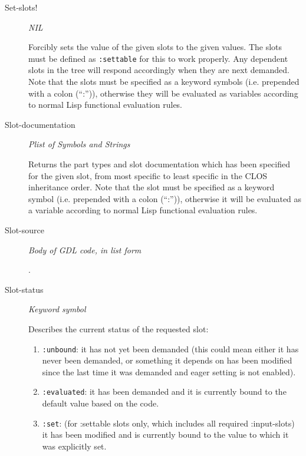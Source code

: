 \documentclass [11pt]{book}
\begin{document}
\begin{itemize}
\begin{description}
\item [Set-slots!]
\emph{NIL}

 Forcibly sets the value of the given slots to the given values. The slots must be defined
as \texttt{:settable} for this to work properly. Any dependent slots in the tree will
respond accordingly when they are next demanded. Note that the slots must be specified as a keyword
symbols (i.e. prepended with a colon (``:'')), otherwise they will be evaluated as variables according
to normal Lisp functional evaluation rules.




\item [Slot-documentation]
\emph{Plist of Symbols and Strings}

 Returns the part types and slot documentation which has been
specified for the given slot, from most specific to least specific in the CLOS inheritance order.
Note that the slot must be specified as a keyword symbol (i.e. prepended with a colon (``:'')),
otherwise it will be evaluated as a variable according to normal Lisp functional evaluation rules.




\item [Slot-source]
\emph{Body of GDL code, in list form}

.




\item [Slot-status]
\emph{Keyword symbol}

 Describes the current status of the requested slot:


\begin{enumerate}

\item \texttt{:unbound}: it has not yet been demanded (this could mean either
it has never been demanded, or something it depends on has been
modified since the last time it was demanded and eager setting is not enabled).


\item \texttt{:evaluated}: it has been demanded and it is currently bound to the default
value based on the code.


\item \texttt{:set}: (for :settable slots only, which includes all required :input-slots)
it has been modified and is currently bound to the value to which it was explicitly set.



\end{enumerate}
\end{description}
\end{itemize}
\end{document}
